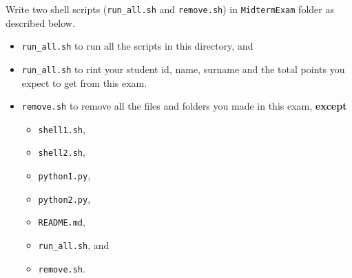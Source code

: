 \question[10]

Write two shell scripts (\texttt{run\_all.sh} and \texttt{remove.sh}) in \texttt{MidtermExam} folder as described below.
\begin{itemize}
\item \texttt{run\_all.sh} to run all the scripts in this directory, and
\item \texttt{run\_all.sh} to rint your student id, name, surname and the total points you expect to get from this exam.
\item \texttt{remove.sh} to remove all the files and folders you made in this exam, \textbf{except}
\begin{itemize}
\item\texttt{shell1.sh},
\item\texttt{shell2.sh},
\item\texttt{python1.py},
\item\texttt{python2.py},
\item\texttt{README.md},
\item\texttt{run\_all.sh}, and
\item\texttt{remove.sh}.
\end{itemize}
\end{itemize}


